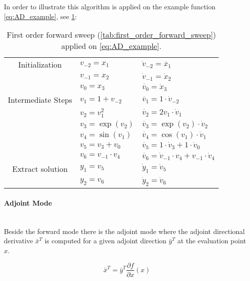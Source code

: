 \documentclass{scrartcl}[12pt, halfparskip]
\numberwithin{equation}{section}
\numberwithin{figure}{section}
\numberwithin{table}{section}
\begin{document}
In order to illustrate this algorithm is applied on the example function \cref{eq:AD_example}, see \cref{tab:AD_example_forward}:

\begin{table}[H]
	\centering
	\begin{tabular}{| c | l | l |} \hline
		Initialization & $v_{-2} = x_1$ & $\dot{v}_{-2} = \dot{x_1}$ \\
		& $v_{-1} = x_2$ & $\dot{v}_{-1} = \dot{x}_2$ \\
		& $v_{0} = x_3$ & $\dot{v_{0}} = \dot{x}_3$ \\ \hline
		Intermediate Steps & $v_1 = 1+v_{-2}$ & $\dot{v_1} = 1 \cdot \dot{v}_{-2}$ \\
		& $v_2 = v_{1}^2$ & $\dot{v_2} = 2 v_1 \cdot \dot{v}_{1}$ \\
		& $v_3 = \exp(v_{2})$ & $\dot{v_3} = \exp(v_2) \cdot \dot{v}_{2}$ \\
		& $v_4 = \sin(v_{1})$ & $\dot{v_4} = \cos(v_1) \cdot \dot{v}_{1}$ \\
		& $v_{5} = v_3 + v_0$ & $\dot{v_{5}} = 1 \cdot \dot{v}_3 + 1 \cdot \dot{v}_0$ \\
		& $v_{6} = v_{-1} \cdot v_4$ & $\dot{v_{6}} = \dot{v}_{-1} \cdot v_4 + v_{-1} \cdot \dot{v}_4$ \\ \hline
		Extract  solution & $y_1 = v_5$ & $\dot{y}_1 = \dot{v}_5$ \\
		& $y_2 = v_6$ & $\dot{y}_2 = \dot{v}_6$ \\ \hline
	\end{tabular}
	\caption{First order forward sweep (\cref{tab:first_order_forward_sweep}) applied on \cref{eq:AD_example}.}
	\label{tab:AD_example_forward}
\end{table}




\paragraph{Adjoint Mode}\mbox{}\\
Beside the forward mode there is the adjoint mode where the adjoint directional derivative $\bar{x}^T$ is computed for a given adjoint direction $\bar{y}^T$ at the evaluation point $x$. 

\begin{equation}
\bar{x}^T = \bar{y}^T \frac{\partial f}{\partial x}(x)
\end{equation}
\end{document}
